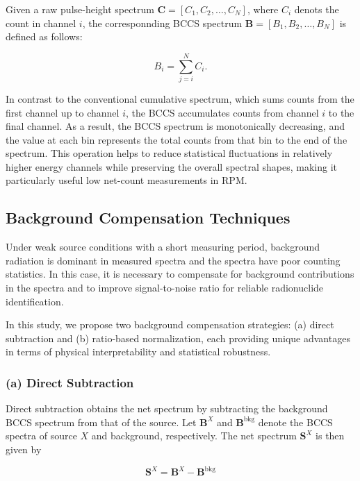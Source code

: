 \documentclass[10pt]{wlscirep}
\begin{document}
Given a raw pulse-height spectrum $\mathbf{C} = [C_1, C_2, \ldots, C_N]$, where $C_i$ denots the count in channel $i$, the corresponnding BCCS spectrum $\mathbf{B} = [B_1, B_2, \ldots , B_N]$ is defined as follows: 

\begin{equation}
B_i = \sum_{j=i}^N C_i.
\end{equation}

In contrast to the conventional cumulative spectrum, which sums counts from the first channel up to channel $i$, the BCCS accumulates counts from channel $i$ to the final channel. As a result, the BCCS spectrum is monotonically decreasing, and the value at each bin represents the total counts from that bin to the end of the spectrum. This operation helps to reduce statistical fluctuations in relatively higher energy channels while preserving the overall spectral shapes, making it particularly useful low net-count measurements in RPM. 

\subsection*{Background Compensation Techniques}

Under weak source conditions with a short measuring period, background radiation is dominant in measured spectra and the spectra have poor counting statistics. In this case, it is necessary to compensate for background contributions in the spectra and to improve signal-to-noise ratio for reliable radionuclide identification. 

In this study, we propose two background compensation strategies: (a) direct subtraction and (b) ratio-based normalization, each providing unique advantages in terms of physical interpretability and statistical robustness.  

\subsubsection*{(a) Direct Subtraction}

Direct subtraction obtains the net spectrum by subtracting the background BCCS spectrum from that of the source. Let $\mathbf{B}^X$ and $\mathbf{B}^\textrm{bkg}$ denote the BCCS spectra of source $X$ and background, respectively. The net spectrum $\mathbf{S}^X$ is then given by

\begin{equation}
\mathbf{S}^X =  \mathbf{B}^X - \mathbf{B}^{\textrm{bkg}}
\end{equation}
\end{document}
